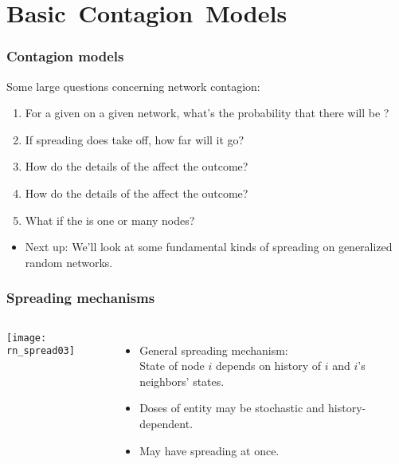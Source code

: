 
\section{Basic\ Contagion\ Models}

\begin{frame}
  \frametitle{Contagion models}

  \begin{block}{Some large questions concerning network contagion:}
    \begin{enumerate}
    \item<2-> 
      For a given 
      on a given network,
      what's the \alert{probability}
      that there will be ?
    \item<3-> If spreading does take off, how far will it go?
    \item<4-> 
      How do the \alert{details} of the 
      affect the outcome?
    \item<5-> 
      How do the \alert{details} of the 
      affect the outcome?
    \item<6-> 
      What if the  is one or many nodes?
    \end{enumerate}
  \end{block}

  \begin{itemize}
  \item<7-> 
    \alert{Next up}: We'll look at some fundamental
    kinds of spreading on generalized random networks.
  \end{itemize}

\end{frame}

\begin{frame}
  \frametitle{Spreading mechanisms}

  \begin{columns}
    \texttt{[image: rn\_spread03]}
    \begin{itemize}
    \item<1->
      \alert{General spreading mechanism}:\\
      State of node $i$ depends on
      history of $i$ and $i$'s neighbors' states.
    \item<2-> 
      \alert{Doses} of entity may be stochastic and history-dependent.
    \item<3-> 
      May have  spreading at once.
    \end{itemize}
  \end{columns}
\end{frame}


